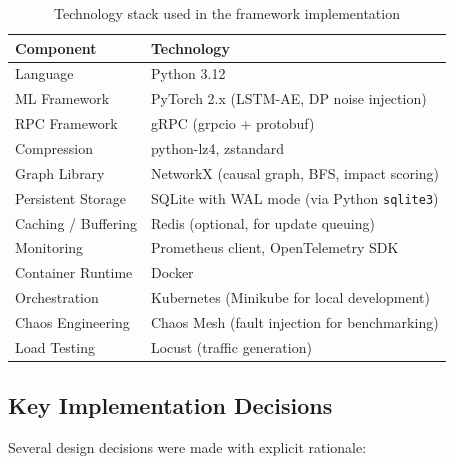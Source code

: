 \begin{table}[H]
    \centering
    \begin{tabular}{|p{}|p{}|}
        \hline
        \textbf{Component} & \textbf{Technology} \\
        \hline
        Language & Python 3.12 \\
        \hline
        ML Framework & PyTorch 2.x (LSTM-AE, DP noise injection) \\
        \hline
        RPC Framework & gRPC (grpcio + protobuf) \\
        \hline
        Compression & python-lz4, zstandard \\
        \hline
        Graph Library & NetworkX (causal graph, BFS, impact scoring) \\
        \hline
        Persistent Storage & SQLite with WAL mode (via Python \texttt{sqlite3}) \\
        \hline
        Caching / Buffering & Redis (optional, for update queuing) \\
        \hline
        Monitoring & Prometheus client, OpenTelemetry SDK \\
        \hline
        Container Runtime & Docker \\
        \hline
        Orchestration & Kubernetes (Minikube for local development) \\
        \hline
        Chaos Engineering & Chaos Mesh (fault injection for benchmarking) \\
        \hline
        Load Testing & Locust (traffic generation) \\
        \hline
    \end{tabular}
    \caption{Technology stack used in the framework implementation}
    \label{tab:tech_stack}
\end{table}

\subsection{Key Implementation Decisions}
\label{subsec:design_decisions}

Several design decisions were made with explicit rationale:

